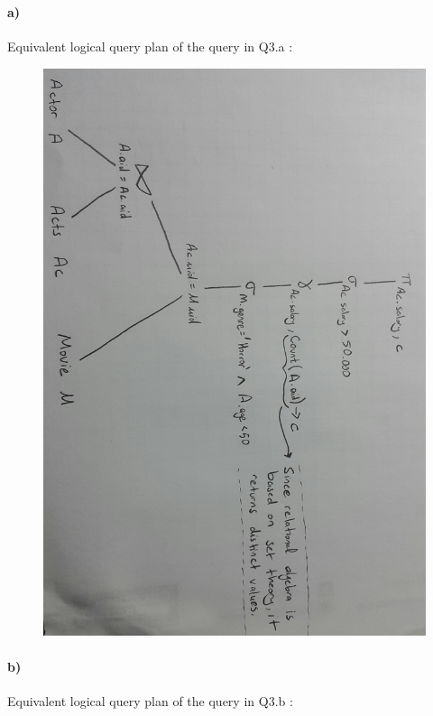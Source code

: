 \documentclass[a4paper,12pt]{article}
\begin{document}
\newpage

\section{}

\paragraph{a)} Equivalent logical query plan of the query in Q3.a : 

\begin{figure} [H]
    \centering
    \includegraphics[scale=0.2]{3.a.jpg}
\end{figure}

\paragraph{b)} Equivalent logical query plan of the query in Q3.b : \\
\end{document}
